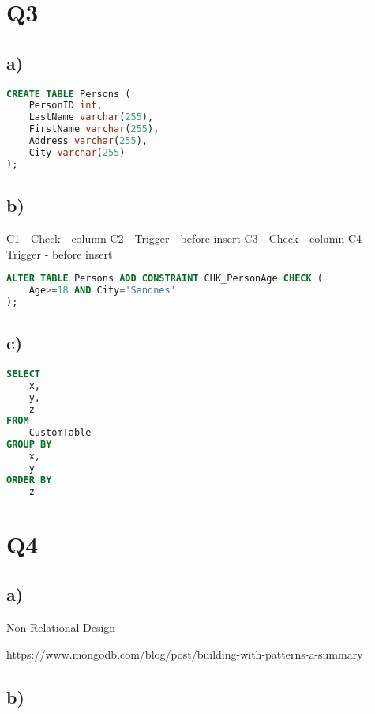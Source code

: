\documentclass{article}
\begin{document}
\pagebreak

\section*{Q3}

\subsection*{\small a)}

\begin{lstlisting}[language=sql]
CREATE TABLE Persons (
    PersonID int,
    LastName varchar(255),
    FirstName varchar(255),
    Address varchar(255),
    City varchar(255)
);
\end{lstlisting}


\subsection*{\small b)}

C1 - Check - column
C2 - Trigger - before insert
C3 - Check - column
C4 - Trigger - before insert
\begin{lstlisting}[language=sql]
ALTER TABLE Persons ADD CONSTRAINT CHK_PersonAge CHECK (
    Age>=18 AND City='Sandnes'
);
\end{lstlisting}

\subsection*{\small c)}

\begin{lstlisting}[language=sql]
SELECT 
    x,
    y,
    z
FROM 
    CustomTable 
GROUP BY 
    x,
    y
ORDER BY
    z
\end{lstlisting}

\section*{Q4}

\subsection*{\small a)}

Non Relational Design

https://www.mongodb.com/blog/post/building-with-patterns-a-summary

\subsection*{\small b)}
\end{document}

